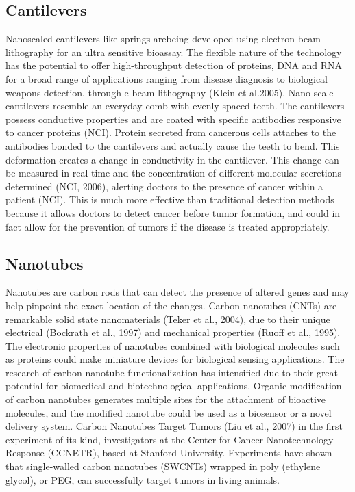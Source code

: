 \documentclass{article}
\begin{document}
\begin{multicols}
\subsection{Cantilevers }Nanoscaled cantilevers like springs arebeing developed using electron-beam lithography for an ultra sensitive bioassay. The flexible nature of the technology has the potential to offer high-throughput detection of proteins, DNA and RNA for a broad range of applications ranging from disease diagnosis to biological weapons detection. through e-beam lithography (Klein et al.2005). Nano-scale cantilevers resemble an everyday comb with evenly spaced teeth. The cantilevers possess conductive properties and are coated with specific antibodies responsive to cancer proteins (NCI). Protein secreted from cancerous cells attaches to the antibodies bonded to the cantilevers and actually cause the teeth to bend. This deformation creates a change in conductivity in the cantilever. This change can be measured in real time and the concentration of different molecular secretions determined (NCI, 2006), alerting doctors to the presence of cancer within a patient (NCI). This is much more effective than traditional detection methods because it allows doctors to detect cancer before tumor formation, and could in fact allow for the prevention of tumors if the disease is treated appropriately. 

\subsection{Nanotubes}Nanotubes are carbon rods that can detect the presence of altered genes and may help pinpoint the exact location of the changes. Carbon nanotubes (CNTs) are remarkable solid state nanomaterials (Teker et al., 2004), due to their unique electrical (Bockrath et al., 1997) and mechanical properties (Ruoff et al., 1995). The electronic properties of nanotubes combined with biological molecules such as proteins could make miniature devices for biological sensing applications. The research of carbon nanotube functionalization has intensified due to their great potential for biomedical and biotechnological applications. Organic modification of carbon nanotubes generates
multiple sites for the attachment of bioactive molecules, and the modified nanotube could be used as a biosensor or a novel delivery system. Carbon Nanotubes Target Tumors (Liu et al., 2007) in the first experiment of its kind, investigators at the Center for Cancer Nanotechnology Response (CCNETR), based at Stanford University. Experiments have shown that single-walled carbon nanotubes (SWCNTs) wrapped in poly (ethylene glycol), or PEG, can successfully target tumors in living animals. 


\end{multicols}
\end{document}
